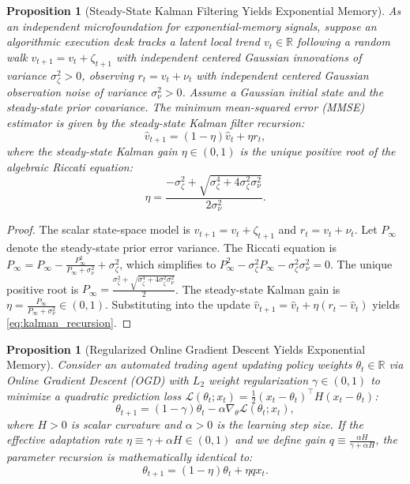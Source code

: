 \documentclass[12pt]{article}
\newtheorem{proposition}[theorem]{Proposition}
\theoremstyle{definition}
\theoremstyle{remark}
\newcommand{\R}{\mathbb{R}}
\begin{document}
\begin{proposition}[Steady-State Kalman Filtering Yields Exponential Memory]
\label{prop:kalman}
As an independent microfoundation for exponential-memory signals, suppose an algorithmic execution desk tracks a latent local trend $v_t \in \R$ following a random walk $v_{t+1} = v_t + \zeta_{t+1}$ with independent centered Gaussian innovations of variance $\sigma_\zeta^2>0$, observing $r_t=v_t+\nu_t$ with independent centered Gaussian observation noise of variance $\sigma_\nu^2>0$. Assume a Gaussian initial state and the steady-state prior covariance. The minimum mean-squared error (MMSE) estimator is given by the steady-state Kalman filter recursion:
\begin{equation}
\hat{v}_{t+1} = (1 - \eta) \hat{v}_t + \eta r_t,
\label{eq:kalman_recursion}
\end{equation}
where the steady-state Kalman gain $\eta \in (0, 1)$ is the unique positive root of the algebraic Riccati equation:
\begin{equation}
\eta = \frac{-\sigma_\zeta^2 + \sqrt{\sigma_\zeta^4 + 4 \sigma_\zeta^2 \sigma_\nu^2}}{2 \sigma_\nu^2}.
\end{equation}
\end{proposition}

\begin{proof}
The scalar state-space model is $v_{t+1} = v_t + \zeta_{t+1}$ and $r_t = v_t + \nu_t$. Let $P_{\infty}$ denote the steady-state prior error variance. The Riccati equation is $P_\infty = P_\infty - \frac{P_\infty^2}{P_\infty + \sigma_\nu^2} + \sigma_\zeta^2$, which simplifies to $P_\infty^2 - \sigma_\zeta^2 P_\infty - \sigma_\zeta^2 \sigma_\nu^2 = 0$. The unique positive root is $P_\infty = \frac{\sigma_\zeta^2 + \sqrt{\sigma_\zeta^4 + 4\sigma_\zeta^2 \sigma_\nu^2}}{2}$. The steady-state Kalman gain is $\eta = \frac{P_\infty}{P_\infty + \sigma_\nu^2} \in (0, 1)$. Substituting into the update $\hat{v}_{t+1} = \hat{v}_t + \eta (r_t - \hat{v}_t)$ yields \eqref{eq:kalman_recursion}.
\end{proof}

\begin{proposition}[Regularized Online Gradient Descent Yields Exponential Memory]
\label{prop:ogd}
Consider an automated trading agent updating policy weights $\theta_t \in \R$ via Online Gradient Descent (OGD) with $L_2$ weight regularization $\gamma \in (0, 1)$ to minimize a quadratic prediction loss $\mathcal{L}(\theta_t; x_t) = \frac{1}{2} (x_t - \theta_t)^\top H (x_t - \theta_t)$:
\begin{equation}
\theta_{t+1} = (1 - \gamma) \theta_t - \alpha \nabla_\theta \mathcal{L}(\theta_t; x_t),
\end{equation}
where $H>0$ is scalar curvature and $\alpha>0$ is the learning step size. If the effective adaptation rate $\eta \equiv \gamma + \alpha H \in (0, 1)$ and we define gain $q \equiv \frac{\alpha H}{\gamma + \alpha H}$, the parameter recursion is mathematically identical to:
\begin{equation}
\theta_{t+1} = (1 - \eta) \theta_t + \eta q x_t.
\end{equation}
\end{proposition}
\end{document}
